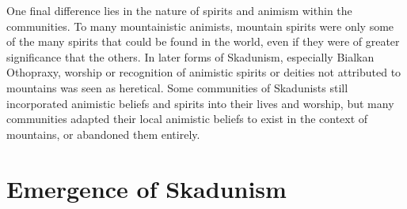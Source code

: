 One final difference lies in the nature of spirits and animism within the communities. To many mountainistic animists, mountain spirits were only some of the many spirits that could be found in the world, even if they were of greater significance that the others. In later forms of Skadunism, especially Bialkan Othopraxy, worship or recognition of animistic spirits or deities not attributed to mountains was seen as heretical. Some communities of Skadunists still incorporated animistic beliefs and spirits into their lives and worship, but many communities adapted their local animistic beliefs to exist in the context of mountains, or abandoned them entirely. \par 

\section{Emergence of Skadunism}
